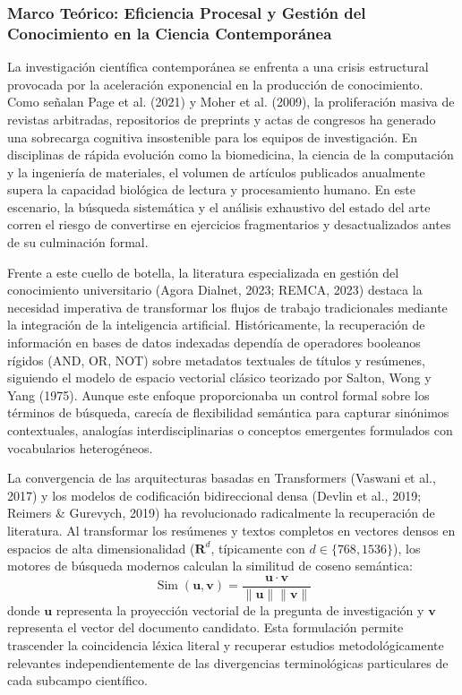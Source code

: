 \subsubsection{Marco Teórico: Eficiencia Procesal y Gestión del Conocimiento en la Ciencia Contemporánea}

La investigación científica contemporánea se enfrenta a una crisis estructural provocada por la aceleración exponencial en la producción de conocimiento. Como señalan Page et al. (2021) y Moher et al. (2009), la proliferación masiva de revistas arbitradas, repositorios de preprints y actas de congresos ha generado una sobrecarga cognitiva insostenible para los equipos de investigación. En disciplinas de rápida evolución como la biomedicina, la ciencia de la computación y la ingeniería de materiales, el volumen de artículos publicados anualmente supera la capacidad biológica de lectura y procesamiento humano. En este escenario, la búsqueda sistemática y el análisis exhaustivo del estado del arte corren el riesgo de convertirse en ejercicios fragmentarios y desactualizados antes de su culminación formal.

Frente a este cuello de botella, la literatura especializada en gestión del conocimiento universitario (Agora Dialnet, 2023; REMCA, 2023) destaca la necesidad imperativa de transformar los flujos de trabajo tradicionales mediante la integración de la inteligencia artificial. Históricamente, la recuperación de información en bases de datos indexadas dependía de operadores booleanos rígidos (AND, OR, NOT) sobre metadatos textuales de títulos y resúmenes, siguiendo el modelo de espacio vectorial clásico teorizado por Salton, Wong y Yang (1975). Aunque este enfoque proporcionaba un control formal sobre los términos de búsqueda, carecía de flexibilidad semántica para capturar sinónimos contextuales, analogías interdisciplinarias o conceptos emergentes formulados con vocabularios heterogéneos.

La convergencia de las arquitecturas basadas en Transformers (Vaswani et al., 2017) y los modelos de codificación bidireccional densa (Devlin et al., 2019; Reimers \& Gurevych, 2019) ha revolucionado radicalmente la recuperación de literatura. Al transformar los resúmenes y textos completos en vectores densos en espacios de alta dimensionalidad ($\mathbf{R}^d$, típicamente con $d \in \{768, 1536\}$), los motores de búsqueda modernos calculan la similitud de coseno semántica:
\begin{equation}
\operatorname{Sim}(\mathbf{u}, \mathbf{v}) = \frac{\mathbf{u} \cdot \mathbf{v}}{\|\mathbf{u}\| \|\mathbf{v}\|}
\end{equation}
donde $\mathbf{u}$ representa la proyección vectorial de la pregunta de investigación y $\mathbf{v}$ representa el vector del documento candidato. Esta formulación permite trascender la coincidencia léxica literal y recuperar estudios metodológicamente relevantes independientemente de las divergencias terminológicas particulares de cada subcampo científico.

